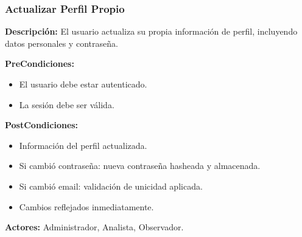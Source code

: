 \subsubsection{Actualizar Perfil Propio}

\textbf{Descripción:} El usuario actualiza su propia información de perfil, incluyendo datos personales y contraseña.

\vspace{0.5em}
\noindent\textbf{PreCondiciones:}
\begin{itemize}[nosep]
    \item El usuario debe estar autenticado.
    \item La sesión debe ser válida.
\end{itemize}

\vspace{0.5em}
\noindent\textbf{PostCondiciones:}
\begin{itemize}[nosep]
    \item Información del perfil actualizada.
    \item Si cambió contraseña: nueva contraseña hasheada y almacenada.
    \item Si cambió email: validación de unicidad aplicada.
    \item Cambios reflejados inmediatamente.
\end{itemize}

\vspace{0.5em}
\noindent\textbf{Actores:} Administrador, Analista, Observador.

